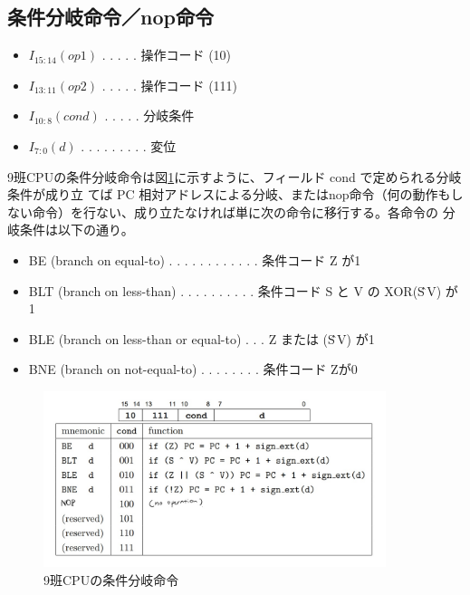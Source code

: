 \documentclass[a4paper,11pt,oneside,openany]{jsarticle}
\begin{document}
\subsection{条件分岐命令／nop命令}
\begin{itemize}
\item $I_{15:14 }(op1)$ . . . . . 操作コード (10)
\item $I_{13:11} (op2)$ . . . . . 操作コード (111)
\item $I_{10:8} (cond)$ . . . . . 分岐条件
\item $I_{7:0} (d)$ . . . . . . . . . 変位
\end{itemize}
9班CPUの条件分岐命令は図\ref{br}に示すように、フィールド cond で定められる分岐条件が成り立
てば PC 相対アドレスによる分岐、またはnop命令（何の動作もしない命令）を行ない、成り立たなければ単に次の命令に移行する。各命令の
分岐条件は以下の通り。
\begin{itemize}
\item BE (branch on equal-to) . . . . . . . . . . . . 条件コード Z が1
\item BLT (branch on less-than) . . . . . . . . . . 条件コード S と V の XOR(S\^\,V) が1
\item BLE (branch on less-than or equal-to) . . . Z または (S\^\,V) が1
\item BNE (branch on not-equal-to) . . . . . . . .  条件コード Zが0
\end{itemize}
\begin{figure}[h]
  \centering
  \includegraphics[width=10cm]{br.jpg}
  \caption{9班CPUの条件分岐命令}
  \label{br}
\end{figure}
\end{document}
